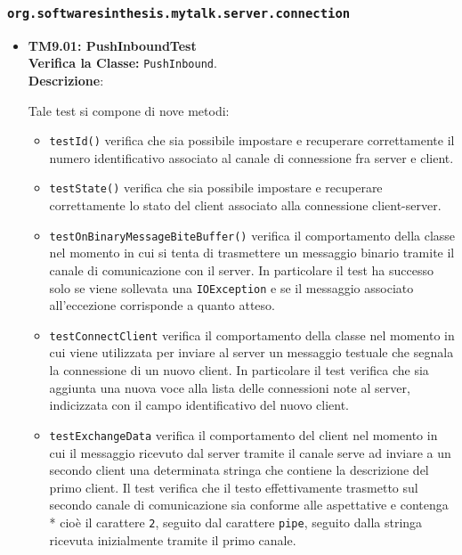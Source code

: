 \subsubsection{\texttt{org.softwaresinthesis.mytalk.server.connection}}
\begin{itemize}

\item \textbf{TM9.01: PushInboundTest}\\
\textbf{Verifica la Classe:} \texttt{PushInbound}.\\
\textbf{Descrizione}: %
 
Tale test si compone di nove metodi:
\begin{itemize}

\item \texttt{testId()} verifica che sia possibile impostare e recuperare correttamente il numero identificativo associato al canale di connessione fra server e client.

\item \texttt{testState()} verifica che sia possibile impostare e recuperare correttamente lo stato del client associato alla connessione client-server.

\item \texttt{testOnBinaryMessageBiteBuffer()} verifica il comportamento della classe nel momento in cui si tenta di trasmettere un messaggio binario tramite il canale di comunicazione con il server. In particolare il test ha successo solo se viene sollevata una \texttt{IOException} e se il messaggio associato all'eccezione corrisponde a quanto atteso.

\item \texttt{testConnectClient} verifica il comportamento della classe nel momento in cui viene  utilizzata per inviare al server un messaggio testuale che segnala la connessione di un nuovo client. In particolare il test verifica che sia aggiunta una nuova voce alla lista delle connessioni note al server, indicizzata con il campo identificativo del nuovo client.

\item \texttt{testExchangeData} verifica il comportamento del client nel momento in cui il messaggio ricevuto dal server tramite il canale serve ad inviare a un secondo client una determinata stringa che contiene la descrizione del primo client. Il test verifica che il testo effettivamente trasmetto sul secondo canale di comunicazione sia conforme alle aspettative e contenga * cioè il carattere \texttt{2}, seguito dal carattere \texttt{pipe}, seguito dalla stringa ricevuta inizialmente tramite il primo canale.


\end{itemize}
\end{itemize}
